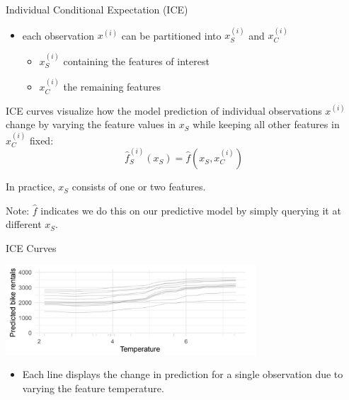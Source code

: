 \documentclass[aspectratio=169]{../latex_main/tntbeamer}  %
\begin{document}
\begin{frame}{Individual Conditional Expectation (ICE) }

\begin{itemize}
    \item each observation $x^{(i)}$ can be partitioned into $x^{(i)}_S$ and $x^{(i)}_C$
    \begin{itemize}
        \item $x^{(i)}_S$ containing the features of interest
        \item $x^{(i)}_C$ the remaining features
    \end{itemize}
\end{itemize}  

\pause

ICE curves visualize how the model prediction of individual observations $x^{(i)}$
change by varying the feature values in $x_S$ while keeping all other features in $x^{(i)}_C$ fixed:
$$\hat{f}_{S}^{(i)}(x_S) = \hat{f}(x_S, x^{(i)}_C)$$

\pause
In practice, $x_S$ consists of one or two features.

\bigskip
\pause

\alert{Note}: $\hat{f}$ indicates we do this on our predictive model by simply querying it at different $x_S$.

\end{frame}

\begin{frame}[c]{ICE Curves}

\vspace{-0.2cm}
\begin{center}
\includegraphics[width=0.7\textwidth]{figure/ICE01.png}
\end{center}
\vspace{-0.3cm}


\begin{itemize}
    \item Each line displays the change in prediction for a single observation due to varying the feature temperature.
\end{itemize}

\end{frame}
\end{document}
